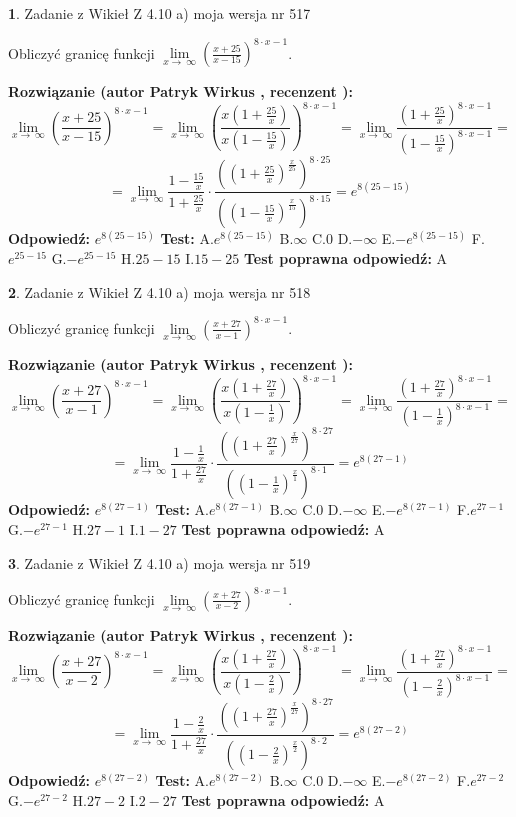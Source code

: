 \documentclass[12pt, a4paper]{article}
\theoremstyle{definition} %
\newtheorem{zad}{}
\newcommand{\zadStart}[1]{\begin{zad}#1\newline}
\newcommand{\zadStop}{\end{zad}}
\newcommand{\rozwStart}[2]{\noindent \textbf{Rozwiązanie (autor #1 , recenzent #2): }\newline}
\newcommand{\rozwStop}{\newline}
\newcommand{\odpStart}{\noindent \textbf{Odpowiedź:}\newline}
\newcommand{\odpStop}{\newline}
\newcommand{\testStart}{\noindent \textbf{Test:}\newline}
\newcommand{\testStop}{\newline}
\newcommand{\kluczStart}{\noindent \textbf{Test poprawna odpowiedź:}\newline}
\newcommand{\kluczStop}{\newline}
\begin{document}
\zadStart{Zadanie z Wikieł Z 4.10 a) moja wersja nr 517}


Obliczyć granicę funkcji  $\lim\limits_{x\to\ \infty}(\frac{x+25}{x-15})^{8\cdot x-1}$.
\zadStop
\rozwStart{Patryk Wirkus}{}
$$\lim\limits_{x\to\ \infty}(\frac{x+25}{x-15})^{8\cdot x-1} = \lim\limits_{x\to\ \infty}(\frac{x(1+\frac{25}{x})}{x(1-\frac{15}{x})})^{8\cdot x-1}=\lim\limits_{x\to\ \infty}\frac{(1+\frac{25}{x})^{8\cdot x-1}}{(1-\frac{15}{x})^{8\cdot x-1}}=$$
$$=\lim\limits_{x\to\ \infty}\frac{1-\frac{15}{x}}{1+\frac{25}{x}}\cdot\frac{((1+\frac{25}{x})^{\frac{x}{25}})^{8\cdot25}}{((1-\frac{15}{x})^{\frac{x}{15}})^{8\cdot15}}=e^{8(25-15)}$$
\rozwStop
\odpStart
$e^{8(25-15)}$
\odpStop
\testStart
A.$e^{8(25-15)}$ B.$\infty$ C.$0$ D.$-\infty$ E.$-e^{8(25-15)}$
F.$e^{25-15}$ G.$-e^{25-15}$
H.$25-15$
I.$15-25$
\testStop
\kluczStart
A
\kluczStop



\zadStart{Zadanie z Wikieł Z 4.10 a) moja wersja nr 518}


Obliczyć granicę funkcji  $\lim\limits_{x\to\ \infty}(\frac{x+27}{x-1})^{8\cdot x-1}$.
\zadStop
\rozwStart{Patryk Wirkus}{}
$$\lim\limits_{x\to\ \infty}(\frac{x+27}{x-1})^{8\cdot x-1} = \lim\limits_{x\to\ \infty}(\frac{x(1+\frac{27}{x})}{x(1-\frac{1}{x})})^{8\cdot x-1}=\lim\limits_{x\to\ \infty}\frac{(1+\frac{27}{x})^{8\cdot x-1}}{(1-\frac{1}{x})^{8\cdot x-1}}=$$
$$=\lim\limits_{x\to\ \infty}\frac{1-\frac{1}{x}}{1+\frac{27}{x}}\cdot\frac{((1+\frac{27}{x})^{\frac{x}{27}})^{8\cdot27}}{((1-\frac{1}{x})^{\frac{x}{1}})^{8\cdot1}}=e^{8(27-1)}$$
\rozwStop
\odpStart
$e^{8(27-1)}$
\odpStop
\testStart
A.$e^{8(27-1)}$ B.$\infty$ C.$0$ D.$-\infty$ E.$-e^{8(27-1)}$
F.$e^{27-1}$ G.$-e^{27-1}$
H.$27-1$
I.$1-27$
\testStop
\kluczStart
A
\kluczStop



\zadStart{Zadanie z Wikieł Z 4.10 a) moja wersja nr 519}


Obliczyć granicę funkcji  $\lim\limits_{x\to\ \infty}(\frac{x+27}{x-2})^{8\cdot x-1}$.
\zadStop
\rozwStart{Patryk Wirkus}{}
$$\lim\limits_{x\to\ \infty}(\frac{x+27}{x-2})^{8\cdot x-1} = \lim\limits_{x\to\ \infty}(\frac{x(1+\frac{27}{x})}{x(1-\frac{2}{x})})^{8\cdot x-1}=\lim\limits_{x\to\ \infty}\frac{(1+\frac{27}{x})^{8\cdot x-1}}{(1-\frac{2}{x})^{8\cdot x-1}}=$$
$$=\lim\limits_{x\to\ \infty}\frac{1-\frac{2}{x}}{1+\frac{27}{x}}\cdot\frac{((1+\frac{27}{x})^{\frac{x}{27}})^{8\cdot27}}{((1-\frac{2}{x})^{\frac{x}{2}})^{8\cdot2}}=e^{8(27-2)}$$
\rozwStop
\odpStart
$e^{8(27-2)}$
\odpStop
\testStart
A.$e^{8(27-2)}$ B.$\infty$ C.$0$ D.$-\infty$ E.$-e^{8(27-2)}$
F.$e^{27-2}$ G.$-e^{27-2}$
H.$27-2$
I.$2-27$
\testStop
\kluczStart
A
\kluczStop
\end{document}
